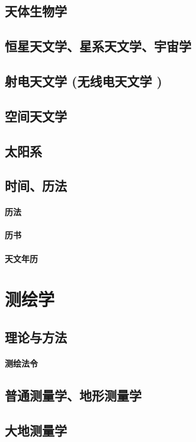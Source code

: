 \documentclass[UTF8]{../NatureUniverse}
\begin{document}
\section{天体生物学}
\section{恒星天文学、星系天文学、宇宙学}
\section{射电天文学 (无线电天文学 )}
\section{空间天文学}
\section{太阳系}
\section{时间、历法}
    \subsubsection{历法}
    \subsubsection{历书}
    \subsubsection{天文年历}







\chapter{测绘学}
\section{理论与方法}
    \subsubsection{测绘法令}
\section{普通测量学、地形测量学}
\section{大地测量学}
\end{document}
